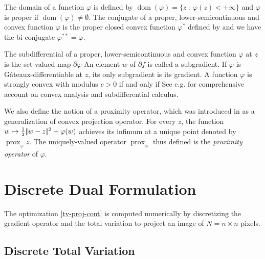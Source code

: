 \documentclass[11pt,nofonttune,a4paper]{IEEEtran}
\DeclareMathOperator{\Prox}{prox}
\DeclareMathOperator{\dom}{dom}
\begin{document}
The domain of a function $\varphi$ is defined by $\dom(\varphi) = \{ z\ :\ \varphi(z) < +\infty \}$ and $\varphi$ is proper if $\dom(\varphi) \neq
\emptyset$. The conjugate of a proper, lower-semicontinuous and convex function $\varphi$ is the proper closed convex function $\varphi^*$ defined by
\eql{
\label{eq:conj}
\varphi^*(z) = \sup_{z \in \dom(\varphi)} \dotp{w}{z} - \varphi(z) ~ ,
}
and we have the bi-conjugate $\varphi^{**}=\varphi$.

The subdifferential of a proper, lower-semicontinuous and convex function $\varphi$ at $z$
is the set-valued map $\partial \varphi$
An element $w$ of $\partial f$ is called a subgradient. If $\varphi$ is G\^ateaux-differentiable at $z$, its only subgradient is its gradient. A function $\varphi$ is strongly convex with modulus $c > 0$ if and only if
See e.g. \cite{LemarechalHiriart96} for comprehensive account on convex analysis and subdifferential calculus.

We also define the notion of a proximity operator, which was introduced in \cite{Moreau1962} as a generalization of convex projection operator. For every $z$, the function $w \mapsto \frac{1}{2}|\!| w-z |\!|^{2} + \varphi(w)$ achieves its infimum at a unique point denoted by $\Prox_{\varphi}z$. The uniquely-valued operator $\Prox_{\varphi}$ thus defined is the \textit{proximity operator} of $\varphi$.


\section{Discrete Dual Formulation}

The optimization \eqref{tv-proj-cont} is computed numerically by discretizing the gradient operator and the total variation to project an image of $N = n \times n$ pixels.

\subsection{Discrete Total Variation}
\end{document}
